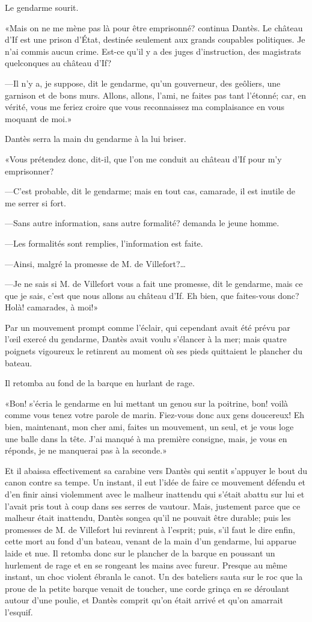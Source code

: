 Le gendarme sourit.

«Mais on ne me mène pas là pour être emprisonné? continua Dantès. Le château d'If est une prison d'État, destinée seulement aux grands coupables politiques. Je n'ai commis aucun crime. Est-ce qu'il y a des juges d'instruction, des magistrats quelconques au château d'If?

—Il n'y a, je suppose, dit le gendarme, qu'un gouverneur, des geôliers, une garnison et de bons murs. Allons, allons, l'ami, ne faites pas tant l'étonné; car, en vérité, vous me feriez croire que vous reconnaissez ma complaisance en vous moquant de moi.»

Dantès serra la main du gendarme à la lui briser.

«Vous prétendez donc, dit-il, que l'on me conduit au château d'If pour m'y emprisonner?

—C'est probable, dit le gendarme; mais en tout cas, camarade, il est inutile de me serrer si fort.

—Sans autre information, sans autre formalité? demanda le jeune homme.

—Les formalités sont remplies, l'information est faite.

—Ainsi, malgré la promesse de M. de Villefort?\dots

—Je ne sais si M. de Villefort vous a fait une promesse, dit le gendarme, mais ce que je sais, c'est que nous allons au château d'If. Eh bien, que faites-vous donc? Holà! camarades, à moi!»

Par un mouvement prompt comme l'éclair, qui cependant avait été prévu par l'œil exercé du gendarme, Dantès avait voulu s'élancer à la mer; mais quatre poignets vigoureux le retinrent au moment où ses pieds quittaient le plancher du bateau.

Il retomba au fond de la barque en hurlant de rage.

«Bon! s'écria le gendarme en lui mettant un genou sur la poitrine, bon! voilà comme vous tenez votre parole de marin. Fiez-vous donc aux gens doucereux! Eh bien, maintenant, mon cher ami, faites un mouvement, un seul, et je vous loge une balle dans la tête. J'ai manqué à ma première consigne, mais, je vous en réponds, je ne manquerai pas à la seconde.»

Et il abaissa effectivement sa carabine vers Dantès qui sentit s'appuyer le bout du canon contre sa tempe. Un instant, il eut l'idée de faire ce mouvement défendu et d'en finir ainsi violemment avec le malheur inattendu qui s'était abattu sur lui et l'avait pris tout à coup dans ses serres de vautour. Mais, justement parce que ce malheur était inattendu, Dantès songea qu'il ne pouvait être durable; puis les promesses de M. de Villefort lui revinrent à l'esprit; puis, s'il faut le dire enfin, cette mort au fond d'un bateau, venant de la main d'un gendarme, lui apparue laide et nue. Il retomba donc sur le plancher de la barque en poussant un hurlement de rage et en se rongeant les mains avec fureur. Presque au même instant, un choc violent ébranla le canot. Un des bateliers sauta sur le roc que la proue de la petite barque venait de toucher, une corde grinça en se déroulant autour d'une poulie, et Dantès comprit qu'on était arrivé et qu'on amarrait l'esquif.

